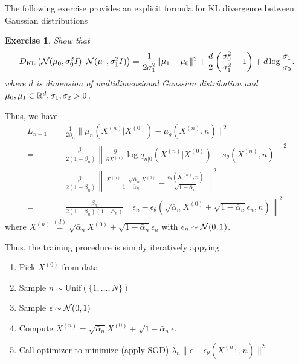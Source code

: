 \documentclass[11pt, a4paper]{article}
\newtheorem{exercise}{Exercise}
\begin{document}
The following exercise provides an explicit formula for KL divergence between Gaussian distributions
\begin{exercise}
    Show that
    \begin{align}
        D_{\mathrm{KL}}\left({\cal N}(\mu_0, \sigma_0^2I) \|{\cal N}(\mu_1, \sigma_1^2I) \right)
        = \frac{1}{2\sigma_1^2} \|\mu_1-\mu_0\|^2 + \frac{d}{2}\left(\frac{\sigma_0^2}{\sigma_1^2}-1\right) + d\log \frac{\sigma_1}{\sigma_0}.
    \end{align}
    where $d$ is dimension of multidimensional Gaussian distribution and $\mu_0, \mu_1\in\mathbb{R}^d, \sigma_1, \sigma_2>0$.
\end{exercise}
Thus, we have
\begin{align}
    L_{n-1} =& \frac{1}{2\beta_n} \|\mu_n(X^{(n)}|X^{(0)}) - \mu_{\theta}(X^{(n)}, n)\|^2\\
    =& \frac{\beta_n}{2(1-\beta_n)} \left\|\frac{\partial}{\partial X^{(n)}} \log q_{n|0}(X^{(n)}|X^{(0)}) - s_{\theta}(X^{(n)}, n)\right\|^2\\
    =& \frac{\beta_n}{2(1-\beta_n)} \left\|\frac{X^{(n)} - \sqrt{\bar{\alpha}_n}X^{(0)}}{1-\bar{\alpha}_n} - \frac{\epsilon_{\theta}(X^{(n)}, n)}{\sqrt{1-\bar{\alpha}_n}}\right\|^2\\
    =& \frac{\beta_n}{2(1-\beta_n)(1-\bar{\alpha}_n)} \left\|\epsilon_n - \epsilon_{\theta}(\sqrt{\bar{\alpha}_n} X^{(0)} + \sqrt{1-\bar{\alpha}_n}\epsilon_n, n)\right\|^2
\end{align}
where $X^{(n)} \stackrel{(d)}{=} \sqrt{\bar{\alpha}_n}X^{(0)} + \sqrt{1-\bar{\alpha}_n} \epsilon_n$ with $\epsilon_n\sim{\cal N}(0, 1)$.




Thus, the training procedure is simply iteratively appying
\begin{enumerate}
    \item Pick $X^{(0)}$ from data
    \item Sample $n\sim\mbox{Unif}(\{1, \dots, N\})$
    \item Sample $\epsilon\sim {\cal N}(0, 1)$
    \item Compute $X^{(n)} = \sqrt{\bar{\alpha}_n} X^{(0)} + \sqrt{1-\bar{\alpha}_n} \epsilon$.
    \item Call optimizer to minimize (apply SGD) $\tilde{\lambda}_n \|\epsilon - \epsilon_\theta(X^{(n)}, n)\|^2$
\end{enumerate}
\end{document}
